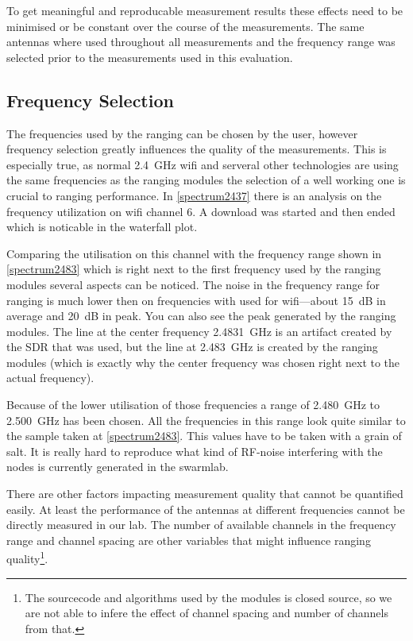 To get meaningful and reproducable measurement results these effects need to be minimised or be constant over the course of the measurements.
The same antennas where used throughout all measurements and the frequency range was selected prior to the measurements used in this evaluation.

\subsection{Frequency Selection}
\label{freqencyselection}
The frequencies used by the ranging can be chosen by the user,
however frequency selection greatly influences the quality of the measurements.
This is especially true, as normal \SI{2.4}{\giga\hertz} wifi and serveral other technologies are using the same frequencies as the ranging modules the selection of a well working one is crucial to ranging performance.
In \autoref{spectrum2437} there is an analysis on the frequency utilization on wifi channel 6.
A download was started and then ended which is noticable in the waterfall plot.

Comparing the utilisation on this channel with the frequency range shown in \autoref{spectrum2483} which is right next to the first frequency used by the ranging modules several aspects can be noticed.
The noise in the frequency range for ranging is much lower then on frequencies with used for wifi—about \SI{15}{dB} in average and \SI{20}{dB} in peak.
You can also see the peak generated by the ranging modules.
The line at the center frequency \SI{2.4831}{\giga\hertz} is an artifact created by the SDR that was used, but the line at \SI{2.483}{\giga\hertz} is created by the ranging modules (which is exactly why the center frequency was chosen right next to the actual frequency).

Because of the lower utilisation of those frequencies a range of \SI{2.480}{\giga\hertz} to \SI{2.500}{\giga\hertz} has been chosen.
All the frequencies in this range look quite similar to the sample taken at \autoref{spectrum2483}.
This values have to be taken with a grain of salt.
It is really hard to reproduce what kind of RF-noise interfering with the nodes is currently generated in the swarmlab.

There are other factors impacting measurement quality that cannot be quantified easily.
At least the performance of the antennas at different frequencies cannot be directly measured in our lab.
The number of available channels in the frequency range and channel spacing are other variables that might influence ranging quality\footnote{The sourcecode and algorithms used by the modules is closed source, so we are not able to infere the effect of channel spacing and number of channels from that.}. 

